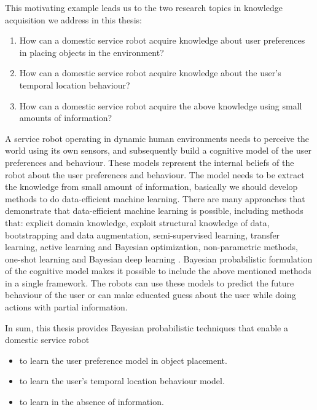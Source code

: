 This motivating example leads us to the two research topics in knowledge acquisition we address in this thesis:
\begin{enumerate}
	\item How can a domestic service robot acquire knowledge about user preferences in placing objects in the environment?
	\item How can a domestic service robot acquire knowledge about the user's temporal location behaviour?
	\item How can a domestic service robot acquire the above knowledge using small amounts of information?
\end{enumerate}

A service robot operating in dynamic human environments needs to perceive the world using its own sensors, and subsequently build a cognitive model of the user preferences and behaviour. These models represent the internal beliefs of the robot about the user preferences and behaviour. The model needs to be extract the knowledge from small amount of information, basically we should develop methods to do data-efficient machine learning. There are many approaches that demonstrate that data-efficient machine learning is possible, including methods that: explicit domain knowledge, exploit structural knowledge of data, bootstrapping and data augmentation, semi-supervised learning, transfer learning, active learning and Bayesian optimization, non-parametric methods, one-shot learning and Bayesian deep learning \cite{https://sites.google.com/site/dataefficientml/home}. 
Bayesian probabilistic formulation of the cognitive model makes it possible to include the above mentioned methods in a single framework. The robots can use these models to predict the future behaviour of the user or can make educated guess about the user while doing actions with partial information.


In sum, this thesis provides Bayesian probabilistic techniques that enable a domestic service robot
\begin{itemize}
	\item to learn the user preference model in object placement.
	\item to learn the user's temporal location behaviour model.
	\item to learn in the absence of information.
\end{itemize}


